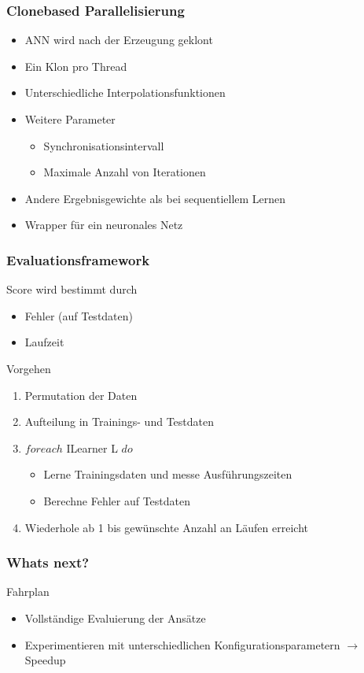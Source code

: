 \documentclass[18pt]{beamer}
\begin{document}
	\begin{frame}[t]\frametitle{Clonebased Parallelisierung}
		\begin{itemize}
			\item ANN wird nach der Erzeugung \glqq geklont\grqq
			\item Ein Klon pro Thread
			\item Unterschiedliche Interpolationsfunktionen
			\item Weitere Parameter
			\begin{itemize}
				\item Synchronisationsintervall
				\item Maximale Anzahl von Iterationen
			\end{itemize}				
			\item Andere Ergebnisgewichte als bei sequentiellem Lernen
			\item Wrapper für ein neuronales Netz
		\end{itemize}
	\end{frame}





	\begin{frame}[c]\frametitle{Evaluationsframework}
		\begin{block}{Score}
			wird bestimmt durch
		    \begin{itemize}
		    	\item Fehler (auf Testdaten)
		    	\item Laufzeit
		    \end{itemize}
		\end{block}
		\begin{block}{Vorgehen}
		    \begin{enumerate}
		    	\item Permutation der Daten
		    	\item Aufteilung in Trainings- und Testdaten
				\item $foreach$ ILearner L $do$
				\begin{itemize}
					\item Lerne Trainingsdaten und messe Ausführungszeiten
					\item Berechne Fehler auf Testdaten
				\end{itemize}
				\item Wiederhole ab 1 bis gewünschte Anzahl an Läufen erreicht
		    \end{enumerate}
		\end{block}
	\end{frame}

	\begin{frame}[c]\frametitle{Whats next?}
		\begin{block}{Fahrplan}
		    \begin{itemize}
		    	\item Vollständige Evaluierung der Ansätze
		    	\item Experimentieren mit unterschiedlichen Konfigurationsparametern $\rightarrow$ Speedup
		    \end{itemize}
		\end{block}
	\end{frame}
\end{document}
